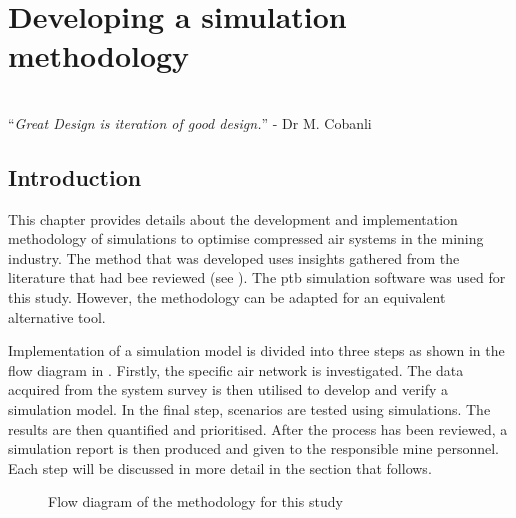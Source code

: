 \chapter{Developing a simulation methodology}
\thispagestyle{empty}
\vspace{40em}
\hrulefill
\\
\enquote{\textit{Great Design is iteration of good design.}} - Dr M. Cobanli\\
\newpage
\section{Introduction}
This chapter provides details about the development and implementation methodology of simulations to optimise compressed air systems in the mining industry. The method that was developed uses insights gathered from the literature that had bee reviewed (see ). The \gls{ptb} simulation software was used for this study. However, the methodology can be adapted for an equivalent alternative tool.
\par 
Implementation of a simulation model is divided into three steps as shown in the flow diagram in . Firstly, the specific air network is investigated. The data acquired from the system survey is then utilised to develop and verify a simulation model. In the final step, scenarios are tested using simulations. The results are then quantified and prioritised. After the process has been reviewed, a simulation report is then produced and given to the responsible mine personnel. Each step will be discussed in more detail in the section that follows.

\begin{figure}[h]
	\centering
	\caption{Flow diagram of the methodology for this study}
	\label{fig: Methodology}
\end{figure}
